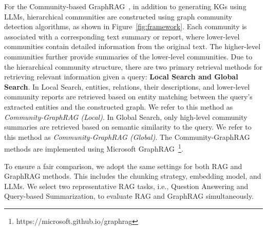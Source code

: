 For the Community-based GraphRAG~\cite{edge2024local}, in addition to generating KGs using LLMs, hierarchical communities are constructed using graph community detection algorithms, as shown in Figure~\ref{fig:framework}. Each community is associated with a corresponding text summary or report, where lower-level communities contain detailed information from the original text. The higher-level communities further provide summaries of the lower-level communities. Due to the hierarchical community structure, there are two primary retrieval methods for retrieving relevant information given a query: {\bf Local Search and Global Search}.  In Local Search, entities, relations, their descriptions, and lower-level community reports are retrieved based on entity matching between the query's extracted entities and the constructed graph. We refer to this method as {\it Community-GraphRAG (Local)}. In Global Search, only high-level community summaries are retrieved based on semantic similarity to the query. We refer to this method as {\it Community-GraphRAG (Global)}. The Community-GraphRAG methods are implemented using Microsoft GraphRAG~\cite{edge2024local}\footnote{https://microsoft.github.io/graphrag}. 

To ensure a fair comparison, we adopt the same settings for both RAG and GraphRAG methods. This includes the chunking strategy, embedding model, and LLMs. We select two representative RAG tasks, i.e., Question Answering and Query-based Summarization, to evaluate RAG and GraphRAG simultaneously.



